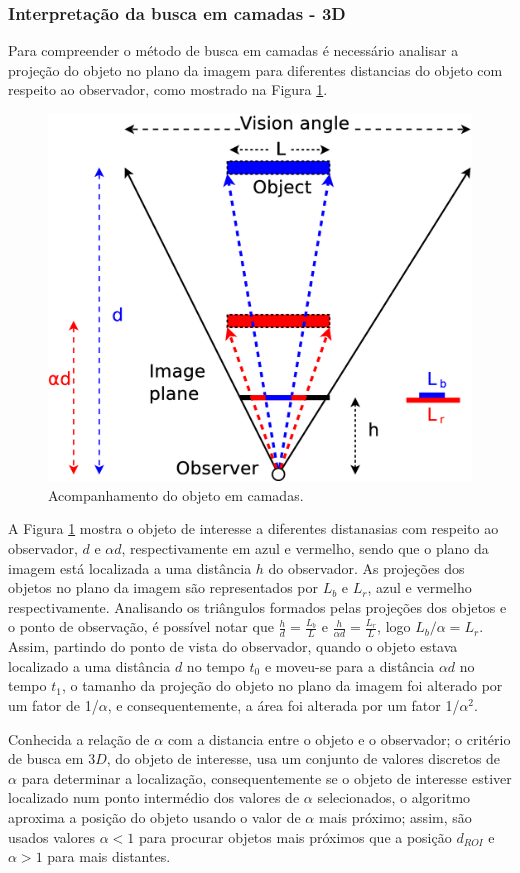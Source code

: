 

\subsubsection{Interpretação da busca em camadas - 3D}

Para compreender o método de busca em camadas é necessário analisar a projeção do objeto 
no plano da imagem para diferentes distancias do objeto com respeito ao observador, 
como mostrado na Figura \ref{fig:multiscale3d}.
\begin{figure}[H]
\centering
  \includegraphics[width=.7\columnwidth]{images/Diagrama3.eps}
  \caption{ Acompanhamento do objeto em camadas.}
  \label{fig:multiscale3d}
\end{figure}
A Figura \ref{fig:multiscale3d} mostra o objeto de interesse a diferentes distanasias com respeito ao observador, 
$d$ e $\alpha d$, respectivamente em azul e vermelho, sendo que
o plano da imagem está localizada a uma distância $h$ do observador. As projeções dos objetos no plano da imagem
 são representados por $L_b$ e $L_r$, azul e vermelho respectivamente. 
 Analisando os triângulos formados pelas projeções dos objetos e o ponto de observação, 
 é possível notar que $\frac{h}{d}=\frac{L_b}{L}$ e $\frac{h}{\alpha d}=\frac{L_r}{L}$, logo 
$L_b/\alpha= L_r$. 
Assim, partindo do ponto de vista do observador, quando o objeto estava localizado a uma distância $d$ no tempo
$t_0$ e moveu-se para a distância $\alpha d$ no tempo $t_1$, o tamanho da projeção do objeto no plano da imagem 
foi alterado por um fator de 1/$\alpha$, e consequentemente, a área foi alterada por um fator 1/$\alpha^2$.

Conhecida a relação de $\alpha$ com a distancia entre o objeto e o observador; 
o critério de busca em $3D$, do objeto de interesse, usa um conjunto de valores 
discretos de $\alpha$ para determinar a localização, 
consequentemente se o objeto de interesse estiver localizado num ponto intermédio dos valores
de $\alpha$ selecionados, o algoritmo aproxima a posição do objeto 
usando o valor de $\alpha$ mais próximo; assim, são usados valores $\alpha<1$
para procurar objetos mais próximos que a posição $d_{ROI}$ e  $\alpha>1$ para mais distantes.



